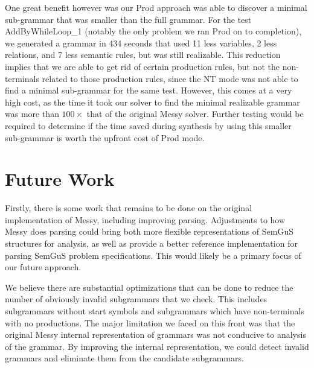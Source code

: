 \documentclass[acmsmall, nonacm]{acmart}
\begin{document}
One great benefit however was our Prod approach was able to discover a minimal sub-grammar that was smaller than the full grammar. For the test AddByWhileLoop_1 (notably the only problem we ran Prod on to completion), we
generated a grammar in 434 seconds that used 11 less variables, 2 less relations, and 7 less semantic rules, but was still realizable.
This reduction implies that we are able to get rid of certain production rules, but not the non-terminals related to those production rules, since
the NT mode was not able to find a minimal sub-grammar for the same test.
However, this comes at a very high cost, as the time it took our solver to find the minimal realizable grammar was more than $100 \times$ that of the original Messy solver. Further testing would be required to determine if the time saved during synthesis by using this smaller sub-grammar is worth the upfront cost of Prod mode.

\section{Future Work}
Firstly, there is some work that remains to be done on the original implementation of Messy, including improving parsing. Adjustments to how Messy does parsing could bring both more flexible representations of SemGuS structures for analysis, as well as provide a better reference implementation for parsing SemGuS problem specifications. This would likely be a primary focus of our future approach.

We believe there are substantial optimizations that can be done to reduce the number of obviously invalid subgrammars that we check. This includes subgrammars without start symbols and subgrammars which have non-terminals with no productions. The major limitation we faced on this front was that the original Messy internal representation of grammars was not conducive to analysis of the grammar. By improving the internal representation, we could detect invalid grammars and eliminate them from the candidate subgrammars.
\end{document}
